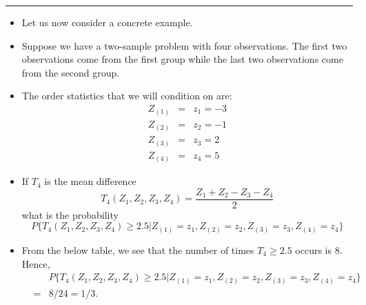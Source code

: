 \documentclass[]{book}
\begin{document}
\begin{center}\rule{0.5\linewidth}{\linethickness}\end{center}

\begin{itemize}
\item
  Let us now consider a concrete example.
\item
  Suppose we have a two-sample problem with four observations. The
  first two observations come from the first group while the last
  two observations come from the second group.
\item
  The order statistics that we will condition on are:
  \begin{eqnarray}
  Z_{(1)} &=& z_{1} = -3 \\
  Z_{(2)} &=& z_{2} = -1 \\
  Z_{(3)} &=& z_{3} = 2 \\
  Z_{(4)} &=& z_{4} = 5
  \end{eqnarray}
\item
  If \(T_{4}\) is the mean difference
  \begin{equation}
  T_{4}(Z_{1}, Z_{2},Z_{3},Z_{4}) = \frac{Z_{1} + Z_{2} - Z_{3} - Z_{4}}{2}
  \end{equation}
  what is the probability
  \begin{equation}
  P\Big\{ T_{4}(Z_{1}, Z_{2}, Z_{3}, Z_{4}) \geq 2.5 | Z_{(1)}=z_{1}, Z_{(2)}=z_{2}, Z_{(3)}=z_{3}, Z_{(4)} = z_{4} \Big \}
  \end{equation}
\item
  From the below table, we see that the number of times \(T_{4} \geq 2.5\) occurs is \(8\).
  Hence,
  \begin{eqnarray}
  & & P\Big\{ T_{4}(Z_{1}, Z_{2}, Z_{3}, Z_{4}) \geq 2.5 | Z_{(1)}=z_{1}, Z_{(2)}=z_{2}, Z_{(3)}=z_{3}, Z_{(4)} = z_{4} \Big \} \nonumber \\
  &=& 8/24 = 1/3. \nonumber
  \end{eqnarray}
\end{itemize}
\end{document}
